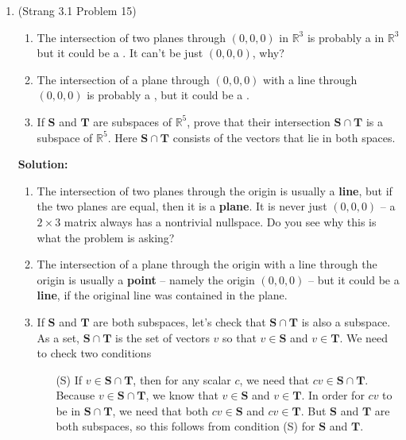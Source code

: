 \documentclass[11pt]{article}
\newcommand{\rr}{\mathbb{R}}
\begin{document}
\begin{enumerate}
\item (Strang 3.1 Problem 15) 

\begin{enumerate}

\item The intersection of two planes through $(0,0,0)$ in $\rr^3$ is probably a \underline{\phantom{aaaaaaaaaaaa}} in $\rr^3$ but it could be a \underline{\phantom{aaaaaaaaaaaa}}.  It can't be just $(0,0,0)$, why?

\item The intersection of a plane through $(0,0,0)$ with a line through $(0,0,0)$ is probably a \underline{\phantom{aaaaaaaaaaaa}}, but it could be a \underline{\phantom{aaaaaaaaaaaa}} .

\item If $\mathbf{S}$ and $\mathbf{T}$ are subspaces of $\rr^5$, prove that their intersection $\mathbf{S} \cap \mathbf{T}$ is a subspace of $\rr^5$.  Here $\mathbf{S} \cap \mathbf{T}$ consists of the vectors that lie in both spaces.

\end{enumerate}

\textbf{Solution:} 

\begin{enumerate}

\item The intersection of two planes through the origin is usually a \textbf{line}, but if the two planes are equal, then it is a \textbf{plane}.  It is never just $(0,0,0)$ -- a $2 \times 3$ matrix always has a nontrivial nullspace.  Do you see why this is what the problem is asking?

\item The intersection of a plane through the origin with a line through the origin is usually a \textbf{point} -- namely the origin $(0,0,0)$ -- but it could be a \textbf{line}, if the original line was contained in the plane.

\item If $\mathbf{S}$ and $\mathbf{T}$ are both subspaces, let's check that $\mathbf{S} \cap \mathbf{T}$ is also a subspace.  As a set, $\mathbf{S} \cap \mathbf{T}$ is the set of vectors $v$ so that $v \in \mathbf{S}$ and $v \in \mathbf{T}$.  We need to check two conditions
\begin{enumerate}
\item[(S)] If $v \in \mathbf{S} \cap \mathbf{T}$, then for any scalar $c$,  we need that $cv \in \mathbf{S} \cap \mathbf{T}$.  Because $v \in \mathbf{S} \cap \mathbf{T}$, we know that $v \in  \mathbf{S}$ and $v \in \mathbf{T}$.  In order for $cv$ to be in $\mathbf{S} \cap \mathbf{T}$, we need that both $cv \in \mathbf{S}$ and $cv \in \mathbf{T}$.  But $\mathbf{S}$ and $\mathbf{T}$ are both subspaces, so this follows from condition (S) for $\mathbf{S}$ and $\mathbf{T}$.


\end{enumerate}
\end{enumerate}
\end{enumerate}
\end{document}
